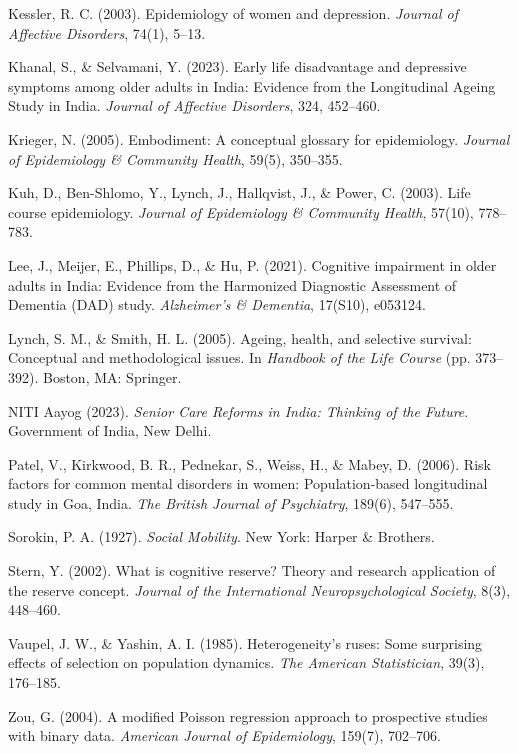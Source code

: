 \begin{enumerate}[leftmargin=1.0cm, label={[\arabic*]}]
    \item Kessler, R. C. (2003). Epidemiology of women and depression. \textit{Journal of Affective Disorders}, 74(1), 5--13.
    \item Khanal, S., \& Selvamani, Y. (2023). Early life disadvantage and depressive symptoms among older adults in India: Evidence from the Longitudinal Ageing Study in India. \textit{Journal of Affective Disorders}, 324, 452--460.
    \item Krieger, N. (2005). Embodiment: A conceptual glossary for epidemiology. \textit{Journal of Epidemiology \& Community Health}, 59(5), 350--355.
    \item Kuh, D., Ben-Shlomo, Y., Lynch, J., Hallqvist, J., \& Power, C. (2003). Life course epidemiology. \textit{Journal of Epidemiology \& Community Health}, 57(10), 778--783.
    \item Lee, J., Meijer, E., Phillips, D., \& Hu, P. (2021). Cognitive impairment in older adults in India: Evidence from the Harmonized Diagnostic Assessment of Dementia (DAD) study. \textit{Alzheimer's \& Dementia}, 17(S10), e053124.
    \item Lynch, S. M., \& Smith, H. L. (2005). Ageing, health, and selective survival: Conceptual and methodological issues. In \textit{Handbook of the Life Course} (pp. 373--392). Boston, MA: Springer.
    \item NITI Aayog (2023). \textit{Senior Care Reforms in India: Thinking of the Future}. Government of India, New Delhi.
    \item Patel, V., Kirkwood, B. R., Pednekar, S., Weiss, H., \& Mabey, D. (2006). Risk factors for common mental disorders in women: Population-based longitudinal study in Goa, India. \textit{The British Journal of Psychiatry}, 189(6), 547--555.
    \item Sorokin, P. A. (1927). \textit{Social Mobility}. New York: Harper \& Brothers.
    \item Stern, Y. (2002). What is cognitive reserve? Theory and research application of the reserve concept. \textit{Journal of the International Neuropsychological Society}, 8(3), 448--460.
    \item Vaupel, J. W., \& Yashin, A. I. (1985). Heterogeneity's ruses: Some surprising effects of selection on population dynamics. \textit{The American Statistician}, 39(3), 176--185.
    \item Zou, G. (2004). A modified Poisson regression approach to prospective studies with binary data. \textit{American Journal of Epidemiology}, 159(7), 702--706.
\end{enumerate}
